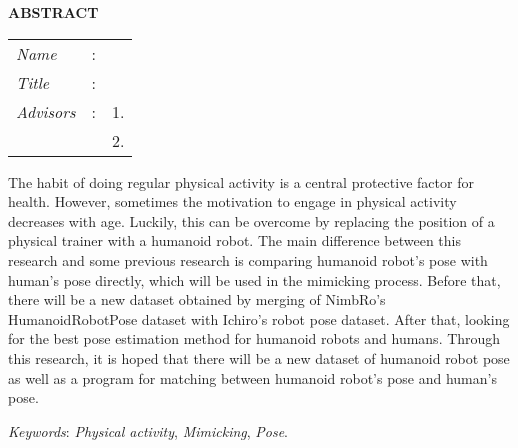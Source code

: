 \begin{center}
  \large\textbf{ABSTRACT}
\end{center}


\vspace{2ex}

\begingroup
\setlength{\tabcolsep}{0pt}

\noindent
\begin{tabularx}{\textwidth}{l >{\centering}m{3em} X}
  \emph{Name}     & : & \name{}         \\

  \emph{Title}    & : & \engtatitle{}   \\

  \emph{Advisors} & : & 1. \advisor{}   \\
                  &   & 2. \coadvisor{} \\
\end{tabularx}
\endgroup

The habit of doing regular physical activity is a central protective factor for health.
However, sometimes the motivation to engage in physical activity decreases with age.
Luckily, this can be overcome by replacing the position of a physical trainer with a humanoid robot.
The main difference between this research and some previous research is comparing humanoid robot's pose with human's pose directly, 
which will be used in the mimicking process.
Before that, there will be a new dataset obtained by merging of NimbRo's HumanoidRobotPose dataset with Ichiro's robot pose dataset.
After that, looking for the best pose estimation method for humanoid robots and humans.
Through this research, it is hoped that there will be a new dataset of humanoid robot pose as well as a program for matching between humanoid robot's pose and human's pose.

\emph{Keywords}: \emph{Physical activity}, \emph{Mimicking}, \emph{Pose}.
